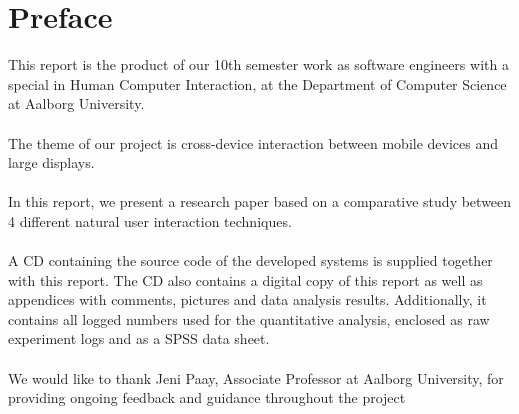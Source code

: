 \section*{Preface}\label{sec:preface}

This report is the product of our 10th semester work as software engineers with a special in Human Computer Interaction, at the Department of Computer Science at Aalborg University.
\\ \\
The theme of our project is cross-device interaction between mobile devices and large displays.
\\ \\
In this report, we present a research paper based on a comparative study between 4 different natural user interaction techniques.
\\ \\
A CD containing the source code of the developed systems is supplied together with this report.
The CD also contains a digital copy of this report as well as appendices with comments, pictures and data analysis results.
Additionally, it contains all logged numbers used for the quantitative analysis, enclosed as raw experiment logs and as a SPSS data sheet.
\\ \\
We would like to thank Jeni Paay, Associate Professor at Aalborg University, for providing ongoing feedback and guidance throughout the project